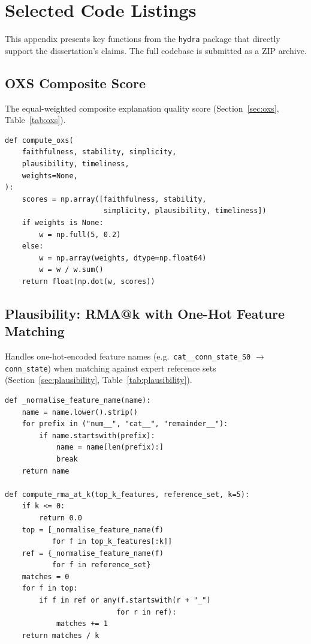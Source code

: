 \documentclass[12pt,a4paper]{report}
\begin{document}
\chapter{Selected Code Listings}
\label{app:code}

This appendix presents key functions from the \texttt{hydra} package that directly support the dissertation's claims. The full codebase is submitted as a ZIP archive.

\section*{OXS Composite Score}
\label{app:code-oxs}

The equal-weighted composite explanation quality score (Section~\ref{sec:oxs}, Table~\ref{tab:oxs}).

\begin{verbatim}
def compute_oxs(
    faithfulness, stability, simplicity,
    plausibility, timeliness,
    weights=None,
):
    scores = np.array([faithfulness, stability,
                       simplicity, plausibility, timeliness])
    if weights is None:
        w = np.full(5, 0.2)
    else:
        w = np.array(weights, dtype=np.float64)
        w = w / w.sum()
    return float(np.dot(w, scores))
\end{verbatim}

\section*{Plausibility: RMA@k with One-Hot Feature Matching}
\label{app:code-rma}

Handles one-hot-encoded feature names (e.g.\ \texttt{cat\_\_conn\_state\_S0} $\to$ \texttt{conn\_state}) when matching against expert reference sets (Section~\ref{sec:plausibility}, Table~\ref{tab:plausibility}).

\begin{verbatim}
def _normalise_feature_name(name):
    name = name.lower().strip()
    for prefix in ("num__", "cat__", "remainder__"):
        if name.startswith(prefix):
            name = name[len(prefix):]
            break
    return name

def compute_rma_at_k(top_k_features, reference_set, k=5):
    if k <= 0:
        return 0.0
    top = [_normalise_feature_name(f)
           for f in top_k_features[:k]]
    ref = {_normalise_feature_name(f)
           for f in reference_set}
    matches = 0
    for f in top:
        if f in ref or any(f.startswith(r + "_")
                          for r in ref):
            matches += 1
    return matches / k
\end{verbatim}
\end{document}
